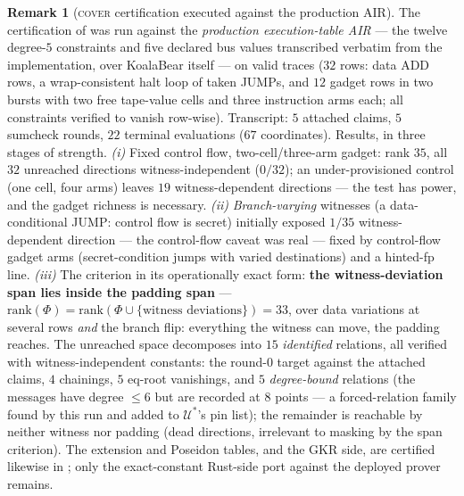 \documentclass{article}
\theoremstyle{definition}
\newtheorem{remark}[theorem]{Remark}
\begin{document}
\begin{remark}[\textsc{cover} certification executed against the production AIR]\label{rem:numK}
The certification of  was run against the \emph{production execution-table AIR} --- the twelve degree-$5$ constraints and five declared bus values transcribed verbatim from the implementation, over KoalaBear itself --- on valid traces ($32$ rows: data \textsc{ADD} rows, a wrap-consistent halt loop of taken \textsc{JUMP}s, and $12$ gadget rows in two bursts with two free tape-value cells and three instruction arms each; all constraints verified to vanish row-wise). Transcript: $5$ attached claims, $5$ sumcheck rounds, $22$ terminal evaluations ($67$ coordinates). Results, in three stages of strength. \emph{(i)} Fixed control flow, two-cell/three-arm gadget: rank $35$, all $32$ unreached directions witness-independent ($0/32$); an under-provisioned control (one cell, four arms) leaves $19$ witness-dependent directions --- the test has power, and the gadget richness is necessary. \emph{(ii)} \emph{Branch-varying} witnesses (a data-conditional \textsc{JUMP}: control flow is secret) initially exposed $1/35$ witness-dependent direction --- the control-flow caveat was real --- fixed by control-flow gadget arms (secret-condition jumps with varied destinations) and a hinted-fp line. \emph{(iii)} The criterion in its operationally exact form: \textbf{the witness-deviation span lies inside the padding span} --- $\mathrm{rank}(\Phi) = \mathrm{rank}(\Phi \cup \{\text{witness deviations}\}) = 33$, over data variations at several rows \emph{and} the branch flip: everything the witness can move, the padding reaches. The unreached space decomposes into $15$ \emph{identified} relations, all verified with witness-independent constants: the round-$0$ target against the attached claims, $4$ chainings, $5$ eq-root vanishings, and $5$ \emph{degree-bound} relations (the messages have degree $\leq 6$ but are recorded at $8$ points --- a forced-relation family found by this run and added to $\mathcal{U}^*$'s pin list); the remainder is reachable by neither witness nor padding (dead directions, irrelevant to masking by the span criterion). The extension and Poseidon tables, and the GKR side, are certified likewise in ; only the exact-constant Rust-side port against the deployed prover remains.
\end{remark}
\end{document}
